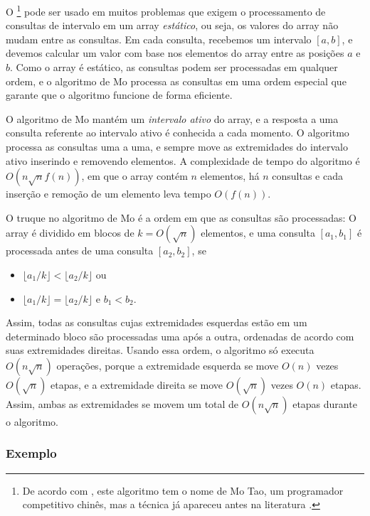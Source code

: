 
O \footnote{De acordo com \cite{cod15}, este algoritmo
tem o nome de Mo Tao, um programador competitivo chinês, mas
a técnica já apareceu antes na literatura \cite{ken06}.}
pode ser usado em muitos problemas
que exigem o processamento de consultas de intervalo em
um array \emph{estático}, ou seja, os valores do array
não mudam entre as consultas.
Em cada consulta, recebemos um intervalo $[a,b]$,
e devemos calcular um valor com base nos
elementos do array entre as posições $a$ e $b$.
Como o array é estático,
as consultas podem ser processadas em qualquer ordem,
e o algoritmo de Mo
processa as consultas em uma ordem especial que garante
que o algoritmo funcione de forma eficiente.

O algoritmo de Mo mantém um \emph{intervalo ativo}
do array, e a resposta a uma consulta
referente ao intervalo ativo é conhecida a cada momento.
O algoritmo processa as consultas uma a uma,
e sempre move as extremidades do
intervalo ativo inserindo e removendo elementos.
A complexidade de tempo do algoritmo é
$O(n \sqrt n f(n))$, em que o array contém
$n$ elementos, há $n$ consultas
e cada inserção e remoção de um elemento
leva tempo $O(f(n))$.

O truque no algoritmo de Mo é a ordem
em que as consultas são processadas:
O array é dividido em blocos de $k=O(\sqrt n)$
elementos, e uma consulta $[a_1,b_1]$
é processada antes de uma consulta $[a_2,b_2]$,
se
\begin{itemize}
\item $\lfloor a_1/k \rfloor < \lfloor a_2/k \rfloor$ ou
\item $\lfloor a_1/k \rfloor = \lfloor a_2/k \rfloor$ e $b_1 < b_2$.
\end{itemize}

Assim, todas as consultas cujas extremidades esquerdas estão
em um determinado bloco são processadas uma após a outra,
ordenadas de acordo com suas extremidades direitas.
Usando essa ordem, o algoritmo
só executa $O(n \sqrt n)$ operações,
porque a extremidade esquerda se move
$O(n)$ vezes $O(\sqrt n)$ etapas,
e a extremidade direita se move
$O(\sqrt n)$ vezes $O(n)$ etapas. Assim, ambas
as extremidades se movem um total de $O(n \sqrt n)$ etapas durante o algoritmo.

\subsubsection*{Exemplo}

